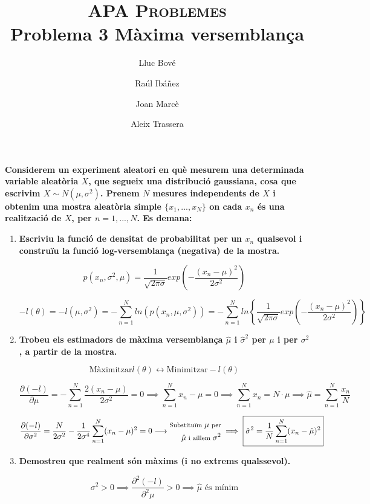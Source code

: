 \documentclass[a4paper]{article}
\title{\textsc{APA Problemes} \\ Problema 3 Màxima versemblança}
\author{Lluc Bové \and Raúl Ibáñez \and Joan Marcè \and Aleix Trassera}
\date{}
\begin{document}
\maketitle

\textbf{Considerem un experiment aleatori en què mesurem una determinada variable aleatòria $X$, que segueix una distribució gaussiana, cosa que escrivim $X \sim N(\mu, \sigma^2)$. Prenem $N$ mesures independents de $X$ i obtenim una mostra aleatòria simple $\{x_1, ..., x_N\}$ on cada $x_n$ és una realització de $X$, per $n=1,...,N$. Es demana:}

\begin{enumerate}
\item \textbf{Escriviu la funció de densitat de probabilitat per un $x_n$ qualsevol i construïu la funció log-versemblança (negativa) de la mostra.}

$$p(x_n, \sigma^2, \mu) = \frac{1}{\sqrt{2\pi\sigma}} exp\left(-\frac{(x_n - \mu)^2}{2\sigma^2}\right)$$

$$ -l(\theta) = -l(\mu,\sigma^2) = -\sum_{n=1}^N ln(p(x_n, \mu, \sigma^2)) = - \sum_{n=1}^N ln \left\{\frac{1}{\sqrt{2\pi\sigma}} exp\left(-\frac{(x_n - \mu)^2}{2\sigma^2}\right) \right\}$$

\item \textbf{Trobeu els estimadors de màxima versemblança $\hat{\mu}$ i $\hat{\sigma}^2$ per $\mu$ i per $\sigma^2$, a partir de la mostra.}

$$\text{Màximitzar} l(\theta) \leftrightarrow \text{Minimitzar} -l(\theta)$$

$$ \frac{\partial(-l)}{\partial\mu} = -\sum_{n=1}^N \frac{2(x_n - \mu)}{2\sigma^2} = 0 \implies 
\sum_{n=1}^N x_n - \mu = 0 \implies \sum_{n=1}^N x_n = N·\mu \implies \boxed{\hat{\mu} = \sum_{n=1}^N \frac{x_n}{N}}$$ 

$$
\frac{\partial(-l)}{\partial\sigma^2} = \frac{N}{2\sigma^2} - \frac{1}{2\sigma^4}\sum_{n=1}^N (x_n - \mu)^2 = 0 \longrightarrow
\begin{aligned}
\footnotesize
\text{Substituïm } \mu \text{ per}\\
\footnotesize
\hat{\mu} \text{ i aïllem } \sigma^2 
\end{aligned} 
\implies \boxed{\hat{\sigma}^2 = \frac{1}{N} \sum_{n=1}^N (x_n - \hat{\mu})^2} $$

\item \textbf{Demostreu que realment són màxims (i no extrems qualssevol).}

$$ \sigma^2 > 0 \implies \frac{\partial^2(-l)}{\partial^2\mu} > 0 \implies \hat{\mu} \text{ és mínim}$$


\end{enumerate}
\end{document}
